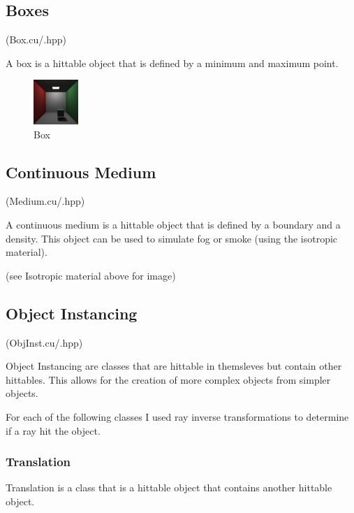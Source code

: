 \documentclass{article}
\begin{document}
    \subsection{Boxes}
    (Box.cu/.hpp)\par
    A box is a hittable object that is defined by a minimum and maximum point. \par

    \begin{figure}[H]
        \centering
        \includegraphics[width=0.15\textwidth]{samples/Box.png}
        \caption{Box}
    \end{figure}


    \subsection{Continuous Medium}
    (Medium.cu/.hpp)\par
    A continuous medium is a hittable object that is defined by a boundary and a density. This object can be used to simulate fog or smoke (using the isotropic material). \par

    (see Isotropic material above for image) \par



    \subsection{Object Instancing}
    (ObjInst.cu/.hpp)\par
    Object Instancing are classes that are hittable in themsleves but contain other hittables. This allows for the creation of more complex objects from simpler objects. \par
    For each of the following classes I used ray inverse transformations to determine if a ray hit the object. \par


        \subsubsection{Translation}
        Translation is a class that is a hittable object that contains another hittable object. \par
\end{document}
